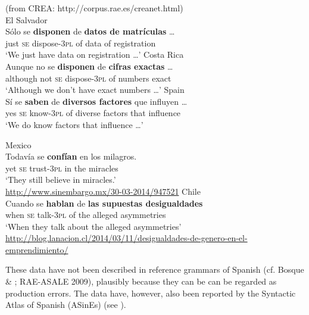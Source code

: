 \documentclass[output=paper]{langsci/langscibook}
\begin{document}
\ea%
    (from CREA: http://corpus.rae.es/creanet.html)\label{ex:gallego:28}\\
    \ea  El Salvador\\
    \gll Sólo se  \textbf{disponen}     de  \textbf{datos de  matrículas} …     \\
         just  \textsc{se}   dispose{}-\textsc{3pl} of  data    of  registration\\
    \glt ‘We just have data on registration …’
    \ex  Costa Rica\\
    \gll Aunque   no   se \textbf{disponen}      de  \textbf{cifras       exactas} …  \\
         although not \textsc{se}   dispose{}-\textsc{3pl}  of   numbers  exact\\
    \glt ‘Although we don’t have exact numbers …’
    \ex  Spain\\
    \gll   Sí   se  \textbf{saben}        de \textbf{diversos factores} que influyen …  \\
           yes \textsc{se}   know{}-\textsc{3pl}  of  diverse   factors    that influence\\
    \glt   ‘We do know factors that influence …’
    \z
\z    


\ea%
    \label{ex:gallego:29}
    \ea  Mexico\\
    \gll Todavía se   \textbf{confían}    en  los   milagros.\\
         yet         \textsc{se}   trust{}-\textsc{3pl}  in  the   miracles\\
    \glt ‘They still believe in miracles.’\\
    {\small\url{http://www.sinembargo.mx/30-03-2014/947521}}
    \ex  Chile\\
    \gll Cuando se   \textbf{hablan}    de  \textbf{las supuestas desigualdades} \\
         when     \textsc{se}   talk{}-\textsc{3pl}   of  the alleged      asymmetries\\
    \glt ‘When they talk about the alleged asymmetries’\\
    {\small\url{http://blog.lanacion.cl/2014/03/11/desigualdades-de-genero-en-el-emprendimiento/}}
    \z
\z    

These data have not been described in reference grammars of Spanish (cf. Bosque \& \citealt{Demonte1999}; RAE-ASALE 2009), plausibly because they can be can be regarded as production errors. The data have, however, also been reported by the Syntactic Atlas of Spanish (ASinEs) (see ).
\end{document}
